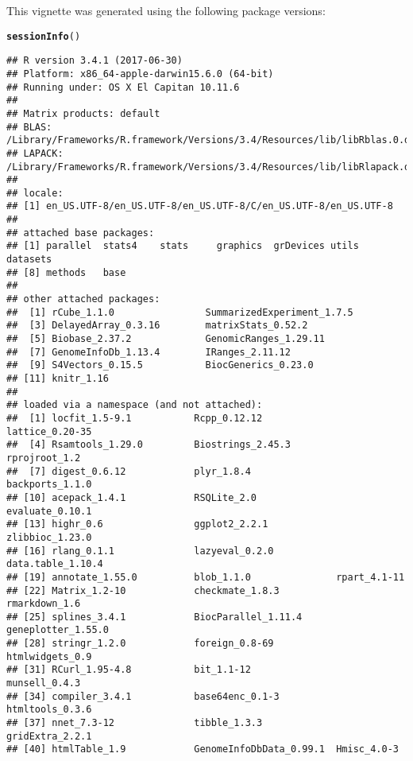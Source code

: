 \documentclass{article}\usepackage[]{graphicx}\usepackage[usenames,dvipsnames]{color}
\makeatletter
\newcommand{\hlstd}[1]{\textcolor[rgb]{0.345,0.345,0.345}{#1}}%
\newcommand{\hlkwd}[1]{\textcolor[rgb]{0.737,0.353,0.396}{\textbf{#1}}}%
\newenvironment{kframe}{%
 \def\at@end@of@kframe{}%
 \ifinner\ifhmode%
  \def\at@end@of@kframe{\end{minipage}}%
  \begin{minipage}{\columnwidth}%
 \fi\fi%
 \def\FrameCommand##1{\hskip\@totalleftmargin \hskip-\fboxsep
 \colorbox{shadecolor}{##1}\hskip-\fboxsep
     \hskip-\linewidth \hskip-\@totalleftmargin \hskip\columnwidth}%
 \MakeFramed {\advance\hsize-\width
   \@totalleftmargin\z@ \linewidth\hsize
   \@setminipage}}%
 {\par\unskip\endMakeFramed%
 \at@end@of@kframe}
\newenvironment{knitrout}{}{} %
\makeatother
\begin{document}
This vignette was generated using the following package versions:

\begin{knitrout}
\color{fgcolor}\begin{kframe}
\begin{alltt}
\hlkwd{sessionInfo}\hlstd{()}
\end{alltt}
\begin{verbatim}
## R version 3.4.1 (2017-06-30)
## Platform: x86_64-apple-darwin15.6.0 (64-bit)
## Running under: OS X El Capitan 10.11.6
## 
## Matrix products: default
## BLAS: /Library/Frameworks/R.framework/Versions/3.4/Resources/lib/libRblas.0.dylib
## LAPACK: /Library/Frameworks/R.framework/Versions/3.4/Resources/lib/libRlapack.dylib
## 
## locale:
## [1] en_US.UTF-8/en_US.UTF-8/en_US.UTF-8/C/en_US.UTF-8/en_US.UTF-8
## 
## attached base packages:
## [1] parallel  stats4    stats     graphics  grDevices utils     datasets 
## [8] methods   base     
## 
## other attached packages:
##  [1] rCube_1.1.0                SummarizedExperiment_1.7.5
##  [3] DelayedArray_0.3.16        matrixStats_0.52.2        
##  [5] Biobase_2.37.2             GenomicRanges_1.29.11     
##  [7] GenomeInfoDb_1.13.4        IRanges_2.11.12           
##  [9] S4Vectors_0.15.5           BiocGenerics_0.23.0       
## [11] knitr_1.16                
## 
## loaded via a namespace (and not attached):
##  [1] locfit_1.5-9.1           Rcpp_0.12.12             lattice_0.20-35         
##  [4] Rsamtools_1.29.0         Biostrings_2.45.3        rprojroot_1.2           
##  [7] digest_0.6.12            plyr_1.8.4               backports_1.1.0         
## [10] acepack_1.4.1            RSQLite_2.0              evaluate_0.10.1         
## [13] highr_0.6                ggplot2_2.2.1            zlibbioc_1.23.0         
## [16] rlang_0.1.1              lazyeval_0.2.0           data.table_1.10.4       
## [19] annotate_1.55.0          blob_1.1.0               rpart_4.1-11            
## [22] Matrix_1.2-10            checkmate_1.8.3          rmarkdown_1.6           
## [25] splines_3.4.1            BiocParallel_1.11.4      geneplotter_1.55.0      
## [28] stringr_1.2.0            foreign_0.8-69           htmlwidgets_0.9         
## [31] RCurl_1.95-4.8           bit_1.1-12               munsell_0.4.3           
## [34] compiler_3.4.1           base64enc_0.1-3          htmltools_0.3.6         
## [37] nnet_7.3-12              tibble_1.3.3             gridExtra_2.2.1         
## [40] htmlTable_1.9            GenomeInfoDbData_0.99.1  Hmisc_4.0-3             

\end{verbatim}
\end{kframe}
\end{knitrout}
\end{document}
